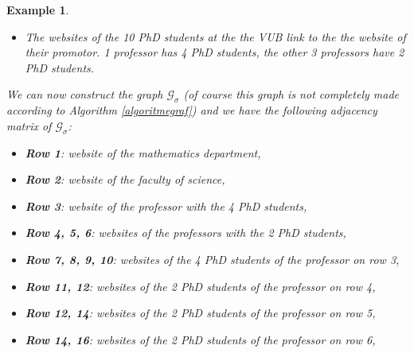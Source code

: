 \documentclass[a4paper,11pt]{report}
\newtheorem{example}[theorem]{Example}
\newcommand{\graf}{\mathscr{G}}
\begin{document}
\begin{example}
\begin{itemize}
    \item The websites of the 10 PhD students at the the VUB link to the the 
    website of their promotor. 1 professor has 4 PhD students, the other 3 professors 
    have 2 PhD students.
      \end{itemize}
We can now construct the graph $\graf_\sigma$ (of course this graph is not completely made according to Algorithm \ref{algoritmegraf}) and we have the following adjacency matrix of 
$\graf_\sigma$:
\setcounter{MaxMatrixCols}{20}
\begin{itemize}
  \item \textbf{Row 1}: website of the mathematics department,
    \item \textbf{Row 2}: website of the faculty of science,
    \item  \textbf{Row 3}: website of the professor with the 4 PhD students,
    \item  \textbf{Row 4, 5, 6}: websites of the professors with the 2 PhD students,
    \item  \textbf{Row 7, 8, 9, 10}: websites of the 4 PhD students of the professor on row 3,
    \item  \textbf{Row 11, 12}: websites of the 2 PhD students of the professor on row 4,
    \item  \textbf{Row 12, 14}: websites of the 2 PhD students of the professor on row 5,
    \item  \textbf{Row 14, 16}: websites of the 2 PhD students of the professor on row 6,



\end{itemize}
\end{example}
\end{document}
